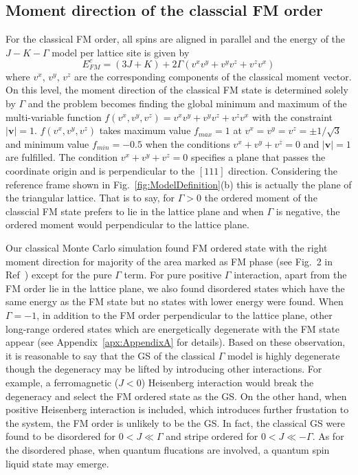 \documentclass[aps,prb,reprint,amsfonts,amsmath,amssymb,showpacs,groupedaddress,superscriptaddress]{revtex4-1}
\begin{document}
\subsection{\label{sec:SectionIIIA}Moment direction of the classcial FM order}
For the classical FM order, all spins are aligned in parallel and the energy of the $J-K-\Gamma$ model per lattice site is given by
\begin{equation}
    E_{FM}^{c} = (3J + K) + 2 \Gamma (v^x v^y + v^y v^z + v^z v^x) \label{eq:EcFM}
\end{equation}
where $v^x$, $v^y$, $v^z$ are the corresponding components of the classical moment vector. On this level, the moment direction of the classical FM state is determined solely by $\Gamma$ and the problem becomes finding the global minimum and maximum of the multi-variable function $f(v^x, v^y, v^z) = v^x v^y + v^y v^z + v^z v^x$ with the constraint $|\bm{v}| = 1$. $f(v^x, v^y, v^z)$ takes maximum value $f_{max}=1$ at $v^x=v^y=v^z=\pm 1/\sqrt{3}$ and minimum value $f_{min}=-0.5$ when the conditions $v^x + v^y + v^z = 0$ and $|\bm{v}| = 1$ are fulfilled. The condition $v^x + v^y + v^z = 0$ specifies a plane that passes the coordinate origin and is perpendicular to the $[111]$ direction. Considering the reference frame shown in Fig.~\ref{fig:ModelDefinition}(b) this is actually the plane of the triangular lattice. That is to say, for $\Gamma > 0$ the ordered moment of the classcial FM state prefers to lie in the lattice plane and when $\Gamma$ is negative, the ordered moment would perpendicular to the lattice plane.

Our classical Monte Carlo simulation found FM ordered state with the right moment direction for majority of the area marked as FM phase (see Fig.~2 in Ref~) except for the pure $\Gamma$ term. For pure positive $\Gamma$ interaction, apart from the FM order lie in the lattice plane, we also found disordered states which have the same energy as the FM state but no states with lower energy were found. When $\Gamma=-1$, in addition to the FM order perpendicular to the lattice plane, other long-range ordered states which are energetically degenerate with the FM state appear (see Appendix~\ref{apx:AppendixA} for details). Based on these observation, it is reasonable to say that the GS of the classical $\Gamma$ model is highly degenerate though the degeneracy may be lifted by introducing other interactions. For example, a ferromagnetic ($J<0$) Heisenberg interaction would break the degeneracy and select the FM ordered state as the GS. On the other hand, when positive Heisenberg interaction is included, which introduces further frustation to the system, the FM order is unlikely to be the GS. In fact, the classical GS were found to be disordered for $0 < J \ll \Gamma$ and stripe ordered for $0 < J \ll -\Gamma$. As for the disordered phase, when quantum flucations are involved, a quantum spin liquid state may emerge.
\end{document}

